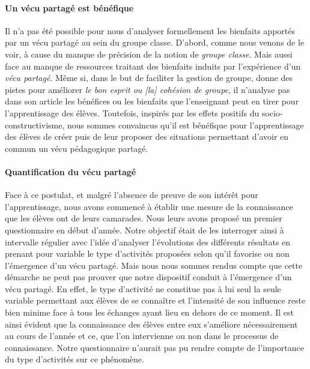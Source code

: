 \paragraph{Un vécu partagé est bénéfique}
%
%
Il n'a pas été possible pour nous d'analyser formellement les bienfaits apportés par un vécu partagé au sein du groupe classe. D'abord, comme nous venons de le voir, à cause du manque de précision de la notion de \emph{groupe classe}. Mais aussi face au manque de ressources traitant des bienfaits induits par l'expérience d'un \emph{vécu partagé}.
%
Même si, dans le but de faciliter la gestion de groupe, \cite{peeters_contribution_2018} donne des pistes pour améliorer \textit{le bon esprit ou [la] cohésion de groupe}, il n'analyse pas dans son article les bénéfices ou les bienfaits que l'enseignant peut en tirer pour l'apprentissage des élèves.
%
Toutefois, inspirés par les effets positifs du socio-constructivisme, nous sommes convaincus qu'il est bénéfique pour l'apprentissage des élèves de créer puis de leur proposer des situations permettant d'avoir en commun un vécu pédagogique partagé.



\paragraph{Quantification du vécu partagé}
%
%
Face à ce postulat, et malgré l'absence de preuve de son intérêt pour l'apprentissage, nous avons commencé à établir une mesure de la connaissance que les élèves ont de leurs camarades. Nous leurs avons proposé un premier questionnaire en début d'année. Notre objectif était de les interroger ainsi à intervalle régulier avec l'idée d'analyser l'évolutions des différents résultats en prenant pour variable le type d'activités proposées selon qu'il favorise ou non l'émergence d'un vécu partagé.
%
Mais nous nous sommes rendus compte que cette démarche ne peut pas prouver que notre dispositif conduit à l'émergence d'un vécu partagé. En effet, le type d'activité ne constitue pas à lui seul la seule variable permettant aux élèves de se connaître
et l'intensité de son influence reste bien minime face à tous les échanges ayant lieu en dehors de ce moment. Il est ainsi évident que la connaissance des élèves entre eux s'améliore nécessairement au cours de l'année et ce, que l'on intervienne ou non dans le processus de connaissance. Notre questionnaire n'aurait pas pu rendre compte de l'importance du type d'activités sur ce phénomène.









